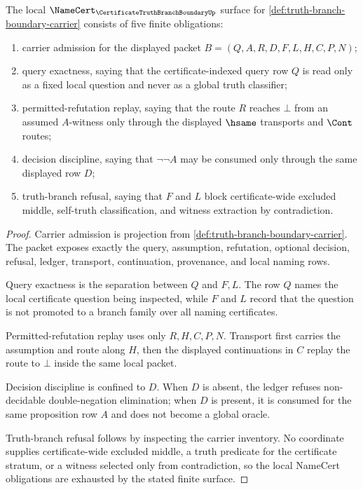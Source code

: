 \begin{theorem}
\label{thm:truth-branch-boundary-namecert-obligations}
The local $\NameCert_{\CertificateTruthBranchBoundaryUp}$ surface for \autoref{def:truth-branch-boundary-carrier} consists of five finite obligations:
\begin{enumerate}
\item carrier admission for the displayed packet $B=(Q,A,R,D,F,L,H,C,P,N)$;
\item query exactness, saying that the certificate-indexed query row $Q$ is read only as a fixed local question and never as a global truth classifier;
\item permitted-refutation replay, saying that the route $R$ reaches $\bot$ from an assumed $A$-witness only through the displayed $\hsame$ transports and $\Cont$ routes;
\item decision discipline, saying that $\neg\neg A$ may be consumed only through the same displayed row $D$;
\item truth-branch refusal, saying that $F$ and $L$ block certificate-wide excluded middle, self-truth classification, and witness extraction by contradiction.
\end{enumerate}
\end{theorem}
\begin{proof}
Carrier admission is projection from \autoref{def:truth-branch-boundary-carrier}. The packet exposes exactly the query, assumption, refutation, optional decision, refusal, ledger, transport, continuation, provenance, and local naming rows.

Query exactness is the separation between $Q$ and $F,L$. The row $Q$ names the local certificate question being inspected, while $F$ and $L$ record that the question is not promoted to a branch family over all naming certificates.

Permitted-refutation replay uses only $R,H,C,P,N$. Transport first carries the assumption and route along $H$, then the displayed continuations in $C$ replay the route to $\bot$ inside the same local packet.

Decision discipline is confined to $D$. When $D$ is absent, the ledger refuses non-decidable double-negation elimination; when $D$ is present, it is consumed for the same proposition row $A$ and does not become a global oracle.

Truth-branch refusal follows by inspecting the carrier inventory. No coordinate supplies certificate-wide excluded middle, a truth predicate for the certificate stratum, or a witness selected only from contradiction, so the local NameCert obligations are exhausted by the stated finite surface.
\end{proof}

